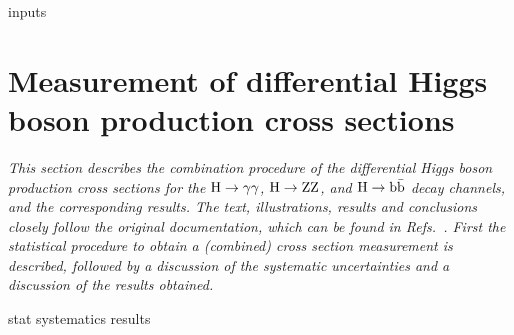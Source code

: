 {inputs}

\section{Measurement of differential Higgs boson production cross sections}

\emph{%
This section describes the combination procedure of the differential Higgs boson production cross sections for the $\mathrm{H}\to\mathrm{\gamma}\mathrm{\gamma}$, $\mathrm{H}\to\mathrm{Z}\mathrm{Z}$, and $\mathrm{H}\to\mathrm{b}\bar{\mathrm{b}}$ decay channels, and the corresponding results. The text, illustrations, results and conclusions closely follow the original documentation, which can be found in Refs.~\cite{AN-17-244,HIG-17-028}. First the statistical procedure to obtain a (combined) cross section measurement is described, followed by a discussion of the systematic uncertainties and a discussion of the results obtained.
}

{stat}
{systematics}
{results}
